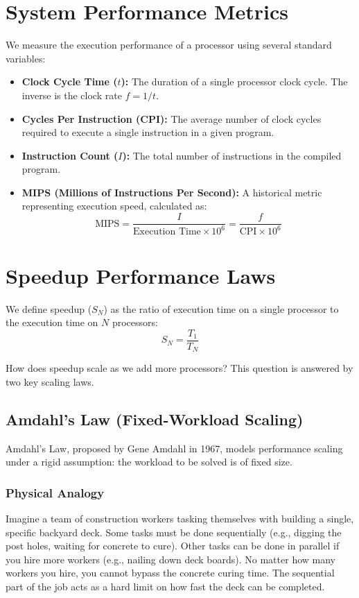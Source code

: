 \documentclass[12pt,a4paper,openany]{book}
\begin{document}
\section{System Performance Metrics}
We measure the execution performance of a processor using several standard variables:
\begin{itemize}
    \item \textbf{Clock Cycle Time ($t$):} The duration of a single processor clock cycle. The inverse is the clock rate $f = 1/t$.
    \item \textbf{Cycles Per Instruction (CPI):} The average number of clock cycles required to execute a single instruction in a given program.
    \item \textbf{Instruction Count ($I$):} The total number of instructions in the compiled program.
    \item \textbf{MIPS (Millions of Instructions Per Second):} A historical metric representing execution speed, calculated as:
          \begin{equation}
              \text{MIPS} = \frac{I}{\text{Execution Time} \times 10^6} = \frac{f}{\text{CPI} \times 10^6}
          \end{equation}
\end{itemize}

\section{Speedup Performance Laws}
We define speedup ($S_N$) as the ratio of execution time on a single processor to the execution time on $N$ processors:
\begin{equation}
    S_N = \frac{T_1}{T_N}
\end{equation}

How does speedup scale as we add more processors? This question is answered by two key scaling laws.

\subsection{Amdahl's Law (Fixed-Workload Scaling)}
Amdahl's Law, proposed by Gene Amdahl in 1967, models performance scaling under a rigid assumption: the workload to be solved is of fixed size.

\subsubsection{Physical Analogy}
Imagine a team of construction workers tasking themselves with building a single, specific backyard deck. Some tasks must be done sequentially (e.g., digging the post holes, waiting for concrete to cure). Other tasks can be done in parallel if you hire more workers (e.g., nailing down deck boards). No matter how many workers you hire, you cannot bypass the concrete curing time. The sequential part of the job acts as a hard limit on how fast the deck can be completed.
\end{document}
